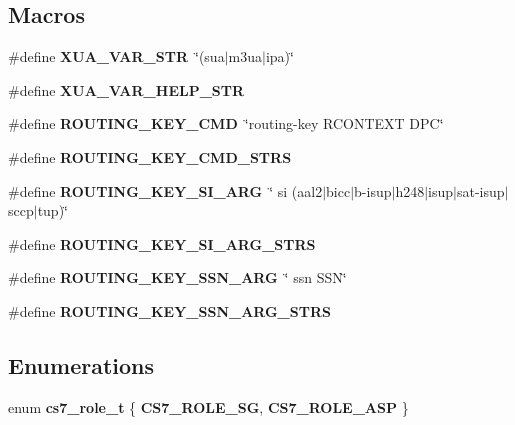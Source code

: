 \subsection*{Macros}
\begin{DoxyCompactItemize}
\item 
\#define {\bf X\+U\+A\+\_\+\+V\+A\+R\+\_\+\+S\+TR}~\char`\"{}(sua$\vert$m3ua$\vert$ipa)\char`\"{}
\item 
\#define {\bf X\+U\+A\+\_\+\+V\+A\+R\+\_\+\+H\+E\+L\+P\+\_\+\+S\+TR}
\item 
\#define {\bf R\+O\+U\+T\+I\+N\+G\+\_\+\+K\+E\+Y\+\_\+\+C\+MD}~\char`\"{}routing-\/key R\+C\+O\+N\+T\+E\+XT D\+PC\char`\"{}
\item 
\#define {\bf R\+O\+U\+T\+I\+N\+G\+\_\+\+K\+E\+Y\+\_\+\+C\+M\+D\+\_\+\+S\+T\+RS}
\item 
\#define {\bf R\+O\+U\+T\+I\+N\+G\+\_\+\+K\+E\+Y\+\_\+\+S\+I\+\_\+\+A\+RG}~\char`\"{} si (aal2$\vert$bicc$\vert$b-\/isup$\vert$h248$\vert$isup$\vert$sat-\/isup$\vert$sccp$\vert$tup)\char`\"{}
\item 
\#define {\bf R\+O\+U\+T\+I\+N\+G\+\_\+\+K\+E\+Y\+\_\+\+S\+I\+\_\+\+A\+R\+G\+\_\+\+S\+T\+RS}
\item 
\#define {\bf R\+O\+U\+T\+I\+N\+G\+\_\+\+K\+E\+Y\+\_\+\+S\+S\+N\+\_\+\+A\+RG}~\char`\"{} ssn S\+SN\char`\"{}
\item 
\#define {\bf R\+O\+U\+T\+I\+N\+G\+\_\+\+K\+E\+Y\+\_\+\+S\+S\+N\+\_\+\+A\+R\+G\+\_\+\+S\+T\+RS}
\end{DoxyCompactItemize}
\subsection*{Enumerations}
\begin{DoxyCompactItemize}
\item 
enum {\bf cs7\+\_\+role\+\_\+t} \{ {\bf C\+S7\+\_\+\+R\+O\+L\+E\+\_\+\+SG}, 
{\bf C\+S7\+\_\+\+R\+O\+L\+E\+\_\+\+A\+SP}
 \}
\end{DoxyCompactItemize}
